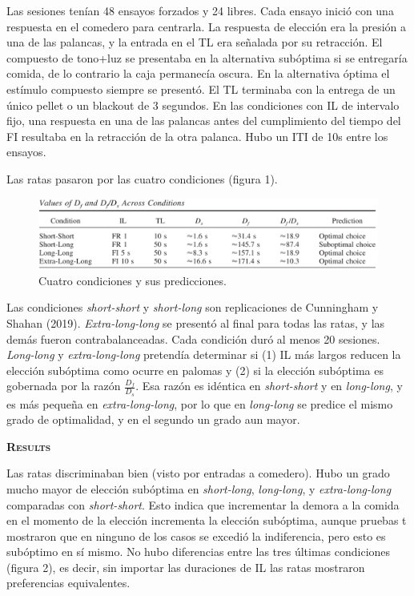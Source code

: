 \documentclass[a4paper,12pt]{article}
\begin{document}
Las sesiones tenían 48 ensayos forzados y 24 libres. Cada ensayo inició con una respuesta en el comedero para centrarla. La respuesta de elección era la presión a una de las palancas, y la entrada en el TL era señalada por su retracción. El compuesto de tono+luz se presentaba en la alternativa subóptima si se entregaría comida, de lo contrario la caja permanecía oscura. En la alternativa óptima el estímulo compuesto siempre se presentó. El TL terminaba con la entrega de un único pellet o un blackout de 3 segundos. En las condiciones con IL de intervalo fijo, una respuesta en una de las palancas antes del cumplimiento del tiempo del FI resultaba en la retracción de la otra palanca. Hubo un ITI de 10s entre los ensayos.

Las ratas pasaron por las cuatro condiciones (figura 1).

\begin{figure}[ht]
	\begin{center}
		\includegraphics[scale=0.4]{Cunningham2020(1).png}
		\caption{Cuatro condiciones y sus predicciones.}
	\end{center}
\end{figure}

Las condiciones {\itshape short-short} y {\itshape short-long} son replicaciones de Cunningham y Shahan (2019). {\itshape Extra-long-long} se presentó al final para todas las ratas, y las demás fueron contrabalanceadas. Cada condición duró al menos 20 sesiones. {\itshape Long-long} y {\itshape extra-long-long} pretendía determinar si (1) IL más largos reducen la elección subóptima como ocurre en palomas y (2) si la elección subóptima es gobernada por la razón $\frac{D_{f}}{D_{s}}$. Esa razón es idéntica en {\itshape short-short} y en {\itshape long-long}, y es más pequeña en {\itshape extra-long-long}, por lo que en {\itshape long-long} se predice el mismo grado de optimalidad, y en el segundo un grado aun mayor.

{\scshape\bfseries Results}

Las ratas discriminaban bien (visto por entradas a comedero). Hubo un grado mucho mayor de elección subóptima en {\itshape short-long}, {\itshape long-long}, y {\itshape extra-long-long} comparadas con {\itshape short-short}. Esto indica que incrementar la demora a la comida en el momento de la elección incrementa la elección subóptima, aunque pruebas t mostraron que en ninguno de los casos se excedió la indiferencia, pero esto es subóptimo en sí mismo. No hubo diferencias entre las tres últimas condiciones (figura 2), es decir, sin importar las duraciones de IL las ratas mostraron preferencias equivalentes.
\end{document}
